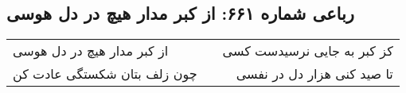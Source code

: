 \begin{center}
\section*{رباعی شماره ۶۶۱: از کبر مدار هیچ در دل هوسی}
\label{sec:sh661}
\begin{longtable}{l p{0.5cm} r}
از کبر مدار هیچ در دل هوسی
&&
کز کبر به جایی نرسیدست کسی
\\
چون زلف بتان شکستگی عادت کن
&&
تا صید کنی هزار دل در نفسی
\\
\end{longtable}
\end{center}
